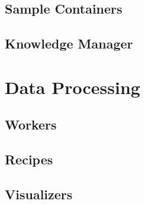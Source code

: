 \documentclass[a4paper]{article}
\begin{document}
\subsection{Sample Containers}
\label{sec:data_model_scs}

\subsection{Knowledge Manager}
\label{sec:data_model_knowledge_manager}

\section{Data Processing}
\label{sec:data_processing}

\subsection{Workers}
\label{sec:data_processing_workers}

\subsection{Recipes}
\label{sec:data_processing_recipes}

\subsection{Visualizers}
\label{sec:data_processing_visualizers}



\clearpage

\printindex
\end{document}
